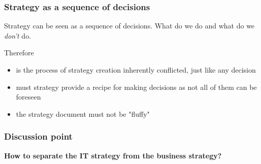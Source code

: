 \begin{frame}[fragile]
  \frametitle{Strategy as a sequence of decisions}
  Strategy can be seen as a sequence of decisions. What do we do and what do we \emph{don't} do. 
  
  Therefore
	\begin{itemize}
		\item is the process of strategy creation inherently conflicted, just like any decision
		\item must strategy provide a recipe for making decisions as not all of them can be foreseen
		\item the strategy document must not be "fluffy"
	\end{itemize}
\end{frame}


\begin{frame}[fragile]
  \frametitle{Discussion point}
		\begin{center}
			\textbf{How to separate the IT strategy from the business strategy?}
		\end{center}
\end{frame}

